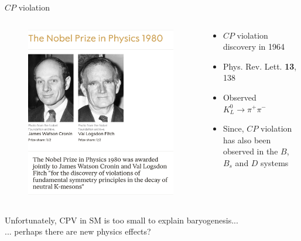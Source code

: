 \documentclass[dvipsnames]{beamer}
\begin{document}
\begin{frame}{$C\!P$ violation}
  \begin{columns}
    \begin{column}{0.4\textwidth}
      \begin{figure}
        \includegraphics[width=1.0\textwidth]{Plots/NobelPrizePhysics1980.png}
      \end{figure}
    \end{column}
    \begin{column}{0.6\textwidth}
      \begin{itemize}
        \setlength\itemsep{1.0em}
        \item{$C\!P$ violation discovery in 1964}
        \item{Phys. Rev. Lett. \textbf{13}, 138}
        \item{Observed $K_L^0\to\pi^+\pi^-$}
        \item{Since, $C\!P$ violation has also been observed in the $B$, $B_s$ and $D$ systems}
      \end{itemize}
    \end{column}
  \end{columns}
  \vspace{0.5cm}
  \begin{center}
    \large Unfortunately, CPV in SM is too small to explain baryogenesis...\\... perhaps there are new physics effects?
  \end{center}
\end{frame}
\end{document}

